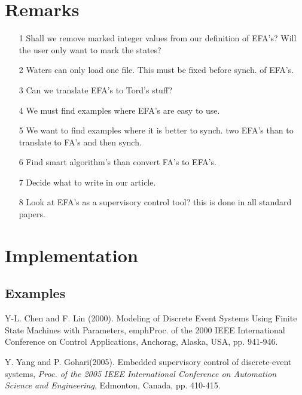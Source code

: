 \documentclass{article}
\begin{document}
\section{Remarks}
\begin{enumerate}
   \item [1] Shall we remove marked integer values from our definition of
EFA's? Will the user only want to mark the states?

    \item [2] Waters can only load one file. This must be fixed
    before synch. of EFA's.

    \item [3] Can we translate EFA's to Tord's stuff?

    \item [4] We must find examples where EFA's are easy to use.

    \item [5] We want to find examples where it is better to
    synch. two EFA's than to translate to FA's and then synch.

    \item [6] Find smart algorithm's  than convert FA's to EFA's.

     \item [7] Decide what to write in our article.

    \item [8] Look at EFA's as a supervisory control tool? this is
    done in all standard papers.

    \end{enumerate}


\section{Implementation}\label{Implementation}
\subsection{Examples}

\begin{thebibliography}{99}

 Y-L. Chen and F. Lin (2000). Modeling of Discrete Event Systems
Using Finite State Machines with Parameters, emph{Proc. of the 2000 IEEE International Conference on Control Applications},
Anchorag, Alaska, USA, pp. 941-946.

Y. Yang and P. Gohari(2005). Embedded supervisory control of discrete-event systems,
\emph{Proc. of the 2005 IEEE International Conference on Automation Science and Engineering},
Edmonton, Canada, pp. 410-415.


\end{thebibliography}
\end{document}

